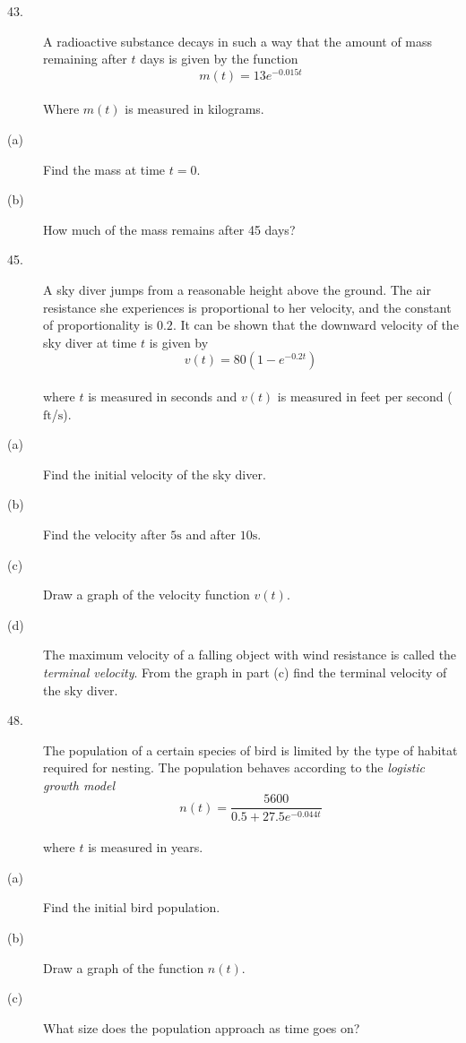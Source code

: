 \begin{description}
\item [43.] A radioactive substance decays in such a way that the amount
of mass remaining after $t$ days is given by the function
\begin{equation*}m (t) =13 e^{ -0.015 t}
\end{equation*} \\\relax Where $m (t)$ is measured in kilograms. 

\item [(a)]
Find the mass at time $t =0.$ 

\item [(b)] How much of the mass
remains after 45 days? 

\item [45.] A sky diver jumps from
a reasonable height above the ground. The air resistance she experiences is proportional to her velocity, and
the constant of proportionality is $0.2$. It can be shown that the downward velocity of the sky diver at time $t$ is given by
\begin{equation*}v (t) =80 \left (1 -e^{ -0.2 t}\right )
\end{equation*} \\\relax where $t$ is measured in seconds and $v (t)$ is measured in feet per second ($\mbox{ft}$/$\mbox{s}$). 

\item [(a)]
Find the initial velocity of the sky diver. 

\item [(b)] Find
the velocity after $5 \mbox{s}$ and after $10 \mbox{s}$. 

\item [(c)]
Draw a graph of the velocity function $v (t)\text{.}$ 

\item [(d)] The maximum
velocity of a falling object with wind resistance is called the \emph{terminal velocity}. From
the graph in part (c) find the terminal velocity of the sky diver. 

\item [48.]
The population of a certain species of bird is limited by the type of habitat required for nesting. The population
behaves according to the \emph{logistic growth model}
\begin{equation*}n (t) =\frac{5600}{0.5 +27.5 e^{ -0.044 t}}
\end{equation*} \\\relax where $t$ is measured in years. 

\item [(a)]
Find the initial bird population. 

\item [(b)] Draw a graph
of the function $n (t)\text{.}$ 

\item [(c)] What size does
the population approach as time goes on? \end{description}

